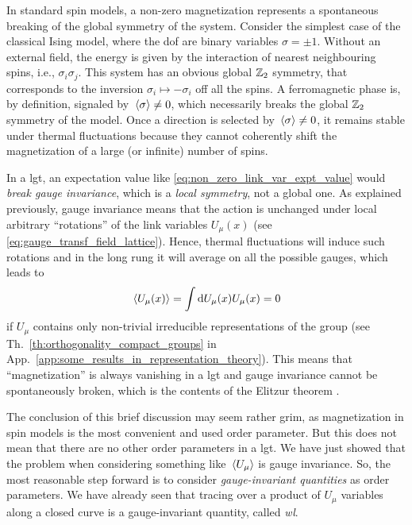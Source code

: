 In standard spin models, a non-zero magnetization represents a spontaneous breaking of the global symmetry of the system.
Consider the simplest case of the classical Ising model, where the \ac{dof} are binary variables $\sigma = \pm 1$.
Without an external field, the energy is given by the interaction of nearest neighbouring spins, i.e., $\sigma_i \sigma_j$.
This system has an obvious global $\mathbb{Z}_2$ symmetry, that corresponds to the inversion $\sigma_i \mapsto -\sigma_i$ off all the spins.
A ferromagnetic phase is, by definition, signaled by $\ev*{\sigma} \neq 0$, which necessarily breaks the global $\mathbb{Z}_2$ symmetry of the model.
Once a direction is selected by $\ev*{\sigma} \neq 0$, it remains stable under thermal fluctuations because they cannot coherently shift the magnetization of a large (or infinite) number of spins.

In a \ac{lgt}, an expectation value like \eqref{eq:non_zero_link_var_expt_value} would \emph{break gauge invariance}, which is a \emph{local symmetry}, not a global one.
As explained previously, gauge invariance means that the action is unchanged under local arbitrary ``rotations'' of the link variables $U_{\mu}(x)$ (see \eqref{eq:gauge_transf_field_lattice}).
Hence, thermal fluctuations will induce such rotations and in the long rung it will average on all the possible gauges, which leads to
\begin{equation}
    \ev*{U_{\mu}(x)} = \int \dd U_{\mu}(x) U_{\mu}(x) = 0
\end{equation}
if $U_{\mu}$ contains only non-trivial irreducible representations of the group (see Th.~\ref{th:orthogonality_compact_groups} in App.~\ref{app:some_results_in_representation_theory}).
This means that ``magnetization'' is always vanishing in a \ac{lgt} and gauge invariance cannot be spontaneously broken, which is the contents of the Elitzur theorem \cite{elitzur1975theorem}.

The conclusion of this brief discussion may seem rather grim, as magnetization in spin models is the most convenient and used order parameter.
But this does not mean that there are no other order parameters in a \ac{lgt}.
We have just showed that the problem when considering something like $\ev*{U_{\mu}}$ is gauge invariance.
So, the most reasonable step forward is to consider \emph{gauge-invariant quantities} as order parameters.
We have already seen that tracing over a product of $U_{\mu}$ variables along a closed curve is a gauge-invariant quantity, called \emph{\acf{wl}}.

